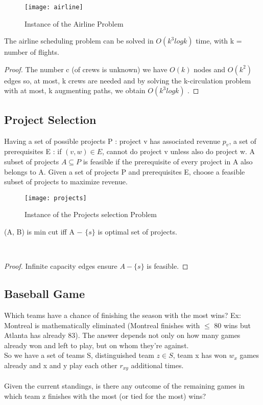 \begin{figure}[H]
    \centering
    \texttt{[image: airline]}
    \caption{Instance of the Airline Problem}
\end{figure}

\begin{claim}
    The airline scheduling problem can be solved in $O(k^{3} log k)$ time, with k = number of flights.
\end{claim}

\begin{proof}
    The number c (of crews is unknown) we have $O(k)$ nodes and $O(k^{2})$ edges so, at most, k crews are needed and by solving the k-circulation problem with at most, k augmenting paths, we obtain $O(k^{3} log k)$ .
\end{proof}

\subsection{Project Selection}
Having a set of possible projects P : project v has associated revenue $p_{v}$, a set of prerequisites E : if $(v, w) \in E$, cannot do project v unless also do project w. A subset of projects $A \subseteq P$ is feasible if the prerequisite of every project in A also belongs to A. Given a set of projects P and prerequisites E, choose a feasible subset of projects to maximize revenue.

\begin{figure}[H]
    \centering
    \texttt{[image: projects]}
    \caption{Instance of the Projects selection Problem}
\end{figure}

\begin{claim}
    (A, B) is min cut iff A − $\{ s \}$ is optimal set of projects.
\end{claim}\\

\begin{proof}
    Infinite capacity edges ensure $A − \{ s \}$ is feasible.
\end{proof}

\subsection{Baseball Game}
Which teams have a chance of finishing the season with the most wins? Ex:  Montreal is mathematically eliminated (Montreal finishes with $\leq$ 80 wins but Atlanta has already 83). The answer depends not only on how many games already won and left to play, but on whom they're against.\\So we have a set of teams S, distinguished team $z \in S$, team x has won $w_{x}$ games already and x and y play each other $r_{xy}$ additional times.\\\\
Given the current standings, is there any outcome of the remaining games in which team z finishes with the most (or tied for the most) wins?

